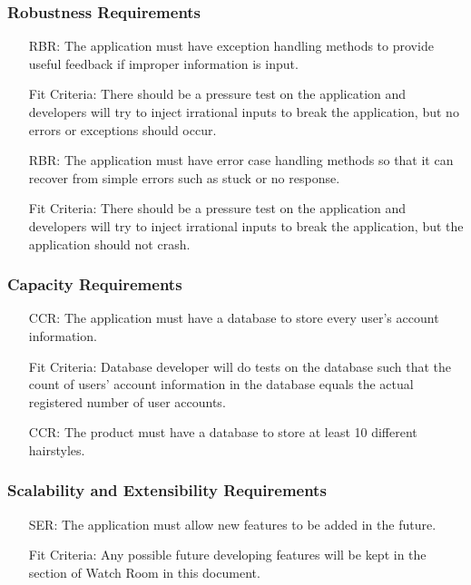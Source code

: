 \documentclass[12pt]{article}
\newcounter{reqnum} %
\newcounter{rbrreqnum} %
\newcounter{ccrreqnum} %
\newcounter{serreqnum} %
\newcounter{crreqnum} %
\begin{document}
\subsubsection{Robustness Requirements}
\begin{itemize}
    \item[RBR\refstepcounter{rbrreqnum}\therbrreqnum \label{R_Inputs}:] The application must have exception handling methods to provide useful feedback if improper information is input.
    \item[] Fit Criteria: There should be a pressure test on the application and developers will try to inject irrational inputs to break the application, but no errors or exceptions should occur.
    \item[RBR\refstepcounter{rbrreqnum}\therbrreqnum \label{R_Inputs}:] The application must have error case handling methods so that it can recover from simple errors such as stuck or no response.
    \item[] Fit Criteria: There should be a pressure test on the application and developers will try to inject irrational inputs to break the application, but the application should not crash.
\end{itemize}

\subsubsection{Capacity Requirements}
\begin{itemize}
    \item[CCR\refstepcounter{ccrreqnum}\theccrreqnum \label{R_Inputs}:] The application must have a database to store every user's account information.
    \item[] Fit Criteria: Database developer will do tests on the database such that the count of users' account information in the database equals the actual registered number of user accounts.
    \item[CCR\refstepcounter{ccrreqnum}\theccrreqnum \label{R_Inputs}:] The product must have a database to store at least 10 different hairstyles.
\end{itemize}

\subsubsection{Scalability and Extensibility Requirements}
\begin{itemize}
    \item[SER\refstepcounter{serreqnum}\theserreqnum \label{R_Inputs}:] The application must allow new features to be added in the future.
    \item[] Fit Criteria: Any possible future developing features will be kept in the section of Watch Room in this document.
\end{itemize}
\end{document}
